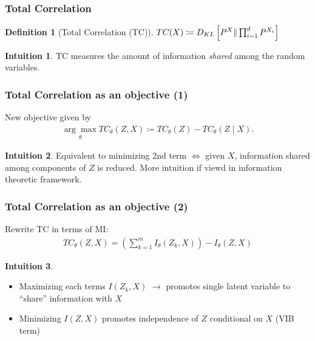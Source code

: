 \documentclass{beamer}
\theoremstyle{definition}
\newtheorem{definition}[section]{Definition}
\newtheorem{intuition}{Intuition}
\begin{document}
    \begin{frame}
      \frametitle{Total Correlation}
      \begin{definition}[Total Correlation (TC)]
        $TC(X) \coloneqq D_{KL}\left[P^{X} \large  \Vert \prod_{i=1}^{d}P^{{X_{i}}}\right] $
      \end{definition}
      \begin{intuition}
        TC measures the amount of information \textit{shared} among the random variables.
      \end{intuition}
    \end{frame}

    \begin{frame}
      \frametitle{Total Correlation as an objective (1)}
      New objective given by
      \begin{align*}
        \underset{\theta}{\arg \max}TC_{\theta}(Z, X) \coloneqq TC_{\theta}(Z) - TC_{\theta}(Z \mid X).
      \end{align*}
      \begin{intuition}
        Equivalent to minimizing 2nd term $\iff$ given $X$, information shared among components of $Z$ is reduced.
        \newline
        More intuition if viewd in information theoretic framework.
      \end{intuition}
    \end{frame}

    \begin{frame}
      \frametitle{Total Correlation as an objective (2)}
      Rewrite TC in terms of MI:
      \begin{align*}
        TC_{\theta}(Z, X) = \left(\sum_{k=1}^{m}I_{\theta}(Z_{k}, X)\right) - I_{\theta}(Z, X)
      \end{align*}
      \begin{intuition}
        \begin{itemize}
          \item Maximizing each terms $I(Z_{k}, X)$ $\to$ promotes single latent variable to \enquote{share} information with $X$
          \item Minimizing $I(Z, X)$ promotes independence of $Z$ conditional on $X$ (VIB term)
        \end{itemize}
      \end{intuition}
    \end{frame}
\end{document}

